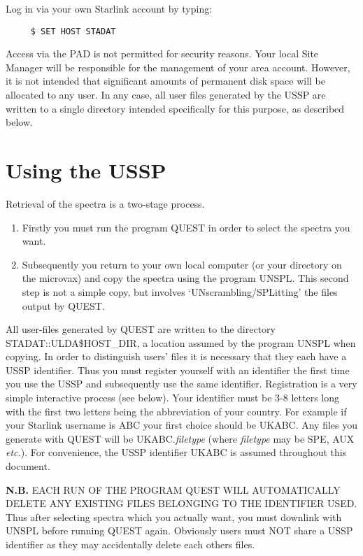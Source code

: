Log in via your own Starlink account by typing:
\begin{verbatim}
     $ SET HOST STADAT
\end{verbatim}
Access via the PAD is not permitted for security reasons.
Your local Site Manager will be responsible for the management
of your area account.
However, it is not intended that significant amounts of permanent
disk space will be allocated to any user.
In any case, all user files generated by the USSP are written
to a single directory intended specifically for this purpose, as described
below.

\section{Using the USSP}

Retrieval of the spectra is a two-stage process.
\begin{enumerate}
\item Firstly you must run the program QUEST in order to
select the spectra you want.
\item Subsequently you return to your own local computer (or your
directory on the microvax) and copy the spectra
using the program UNSPL.
This second step is not a simple copy, but involves `UNscrambling/SPLitting'
the files output by QUEST.
\end{enumerate}
All user-files generated by QUEST are written to the
directory  STADAT::ULDA\$HOST\_DIR,  a location assumed by
the program UNSPL when copying.
In order to distinguish users' files it is necessary that they each have
a USSP identifier.
Thus you must register yourself with an identifier the first time you
use the USSP and subsequently use the same identifier.
Registration is a very simple interactive process (see below).
Your identifier must be 3-8 letters long with the first two letters
being the abbreviation of your country.
For example if your Starlink username is  ABC your first choice
should be UKABC.
Any files you generate with QUEST will be
UKABC.{\it filetype} (where {\it filetype} may be SPE, AUX {\it etc.}).
For convenience, the USSP identifier UKABC is assumed throughout this document.

{\bf N.B.} EACH RUN OF THE PROGRAM  QUEST WILL AUTOMATICALLY DELETE
ANY EXISTING FILES BELONGING TO THE IDENTIFIER USED.
Thus after selecting spectra which you actually want,  you must downlink with
UNSPL before running QUEST again.
Obviously users must NOT share a USSP identifier as they may accidentally
delete each others files.

